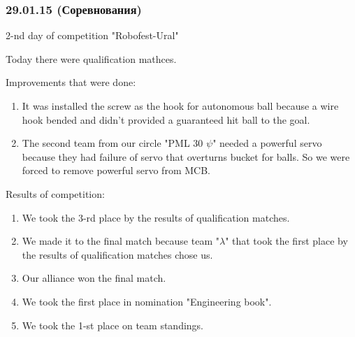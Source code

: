 \subsubsection{29.01.15 (Соревнования)}
\begin{center}
	2-nd day of competition "Robofest-Ural"
\end{center}
Today there were qualification mathces.
\newline 

Improvements that were done:
\begin{enumerate}
	\item It was installed the screw as the hook for autonomous ball because a wire hook bended and didn't provided a guaranteed hit ball to the goal.
	
	\item The second team from our circle "PML 30 ${\psi}$" needed a powerful servo because they had failure of servo that overturns bucket for balls. So we were forced to remove powerful servo from MCB.
	
\end{enumerate}

Results of competition:
\begin{enumerate}
	\item We took the 3-rd place by the results of qualification matches.
	
	\item We made it to the final match because team "${\lambda}$" that took the first place by the results of qualification matches chose us.
	
	\item Our alliance won the final match.
	
	\item We took the first place in nomination "Engineering book".
	
	\item We took the 1-st place on team standings.
\end{enumerate}

